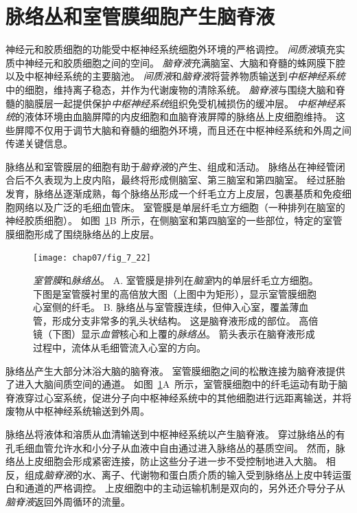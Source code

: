 \section{脉络丛和室管膜细胞产生脑脊液}

神经元和胶质细胞的功能受中枢神经系统细胞外环境的严格调控。
\textit{间质液}填充实质中神经元和胶质细胞之间的空间。
\textit{脑脊液}充满脑室、大脑和脊髓的蛛网膜下腔以及中枢神经系统的主要脑池。
\textit{间质液}和\textit{脑脊液}将营养物质输送到\textit{中枢神经系统}中的细胞，维持离子稳态，并作为代谢废物的清除系统。
\textit{脑脊液}与围绕大脑和脊髓的脑膜层一起提供保护\textit{中枢神经系统}组织免受机械损伤的缓冲层。
\textit{中枢神经系统}的液体环境由血脑屏障的内皮细胞和血脑脊液屏障的脉络丛上皮细胞维持。
这些屏障不仅用于调节大脑和脊髓的细胞外环境，而且还在中枢神经系统和外周之间传递关键信息。


脉络丛和室管膜层的细胞有助于\textit{脑脊液}的产生、组成和活动。
脉络丛在神经管闭合后不久表现为上皮内陷，最终将形成侧脑室、第三脑室和第四脑室。
经过胚胎发育，脉络丛逐渐成熟，每个脉络丛形成一个纤毛立方上皮层，包裹基质和免疫细胞网络以及广泛的毛细血管床。
室管膜是单层纤毛立方细胞（一种排列在脑室的神经胶质细胞）。
如图~\ref{fig:7_22}B~所示，在侧脑室和第四脑室的一些部位，特定的室管膜细胞形成了围绕脉络丛的上皮层。


\begin{figure}[htbp]
	\centering
	\texttt{[image: chap07/fig\_7\_22]}
	\caption{\textit{室管膜}和\textit{脉络丛}。
		A. 室管膜是排列在\textit{脑室}内的单层纤毛立方细胞。
		下图是室管膜衬里的高倍放大图（上图中为矩形），显示室管膜细胞心室侧的纤毛。
		B. 脉络丛与室管膜连续，但伸入心室，覆盖薄血管，形成分支非常多的乳头状结构。
		这是脑脊液形成的部位。
		高倍镜（下图）显示\textit{血管}核心和上覆的\textit{脉络丛}。
		箭头表示在脑脊液形成过程中，流体从毛细管流入心室的方向。}
	\label{fig:7_22}
\end{figure}


脉络丛产生大部分沐浴大脑的脑脊液。
室管膜细胞之间的松散连接为脑脊液提供了进入大脑间质空间的通道。
如图~\ref{fig:7_22}A~所示，室管膜细胞中的纤毛运动有助于脑脊液穿过心室系统，促进分子向中枢神经系统中的其他细胞进行远距离输送，并将废物从中枢神经系统输送到外周。


脉络丛将液体和溶质从血清输送到中枢神经系统以产生脑脊液。
穿过脉络丛的有孔毛细血管允许水和小分子从血液中自由通过进入脉络丛的基质空间。
然而，脉络丛上皮细胞会形成紧密连接，防止这些分子进一步不受控制地进入大脑。
相反，组成\textit{脑脊液}的水、离子、代谢物和蛋白质介质的输入受到脉络丛上皮中转运蛋白和通道的严格调控。
上皮细胞中的主动运输机制是双向的，另外还介导分子从\textit{脑脊液}返回外周循环的流量。


